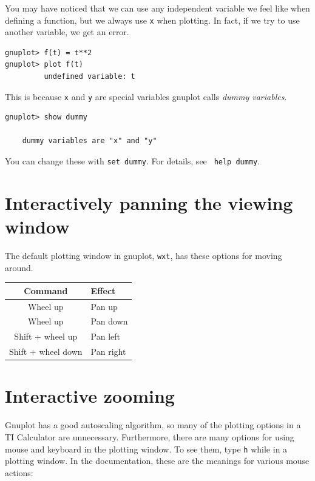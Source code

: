 \documentclass[11pt,letterpaper]{report}
\begin{document}

You may have noticed that we can use any independent variable we feel like when defining a function, but we always use \verb+x+ when plotting. In fact, if we try to use another variable, we get an error.
\begin{verbatim}
gnuplot> f(t) = t**2
gnuplot> plot f(t)
         undefined variable: t

\end{verbatim}

This is because \verb+x+ and \verb+y+ are special variables gnuplot calls \emph{dummy variables}.

\begin{verbatim}
gnuplot> show dummy

	dummy variables are "x" and "y"

\end{verbatim}

You can change these with \verb+set dummy+. For details, see \verb+ help dummy+.


\section{Interactively panning the viewing window}

The default plotting window in gnuplot, \verb+wxt+, has these options for moving around.

\begin{center}
	\begin{tabular}{|c|l|}
	\hline 
	Command & Effect \\
	\hline
	Wheel up & Pan up \\
	\hline
	Wheel up & Pan down \\
	\hline
	Shift + wheel up & Pan left \\
	\hline
	Shift + wheel down & Pan right \\
	\hline
	\end{tabular}
\end{center}



\section{Interactive zooming}

Gnuplot has a good autoscaling algorithm, so many of the plotting options in a TI Calculator are unnecessary. Furthermore, there are many options for using mouse and keyboard in the plotting window. To see them, type \lstinline+h+ while in a plotting window. In the documentation, these are the meanings for various mouse actions:
\end{document}
